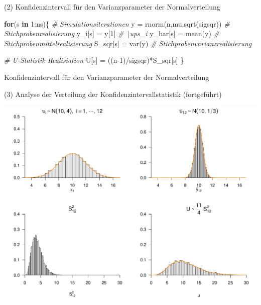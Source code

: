 \documentclass[
  8pt,
  ignorenonframetext,
]{beamer}
\newenvironment{Shaded}{\begin{snugshade}}{\end{snugshade}}
\newcommand{\CommentTok}[1]{\textcolor[rgb]{0.56,0.35,0.01}{\textit{#1}}}
\newcommand{\ControlFlowTok}[1]{\textcolor[rgb]{0.13,0.29,0.53}{\textbf{#1}}}
\newcommand{\DecValTok}[1]{\textcolor[rgb]{0.00,0.00,0.81}{#1}}
\newcommand{\FunctionTok}[1]{\textcolor[rgb]{0.00,0.00,0.00}{#1}}
\newcommand{\NormalTok}[1]{#1}
\newcommand{\OtherTok}[1]{\textcolor[rgb]{0.56,0.35,0.01}{#1}}
\newcommand{\SpecialCharTok}[1]{\textcolor[rgb]{0.00,0.00,0.00}{#1}}
\begin{document}
\begin{frame}[fragile]{(2) Konfidenzintervall für den Varianzparameter
der Normalverteilung}
\begin{Shaded}
\begin{Highlighting}[]
\ControlFlowTok{for}\NormalTok{(s }\ControlFlowTok{in} \DecValTok{1}\SpecialCharTok{:}\NormalTok{ns)\{                                 }\CommentTok{\# Simulationsiterationen}
\NormalTok{  y         }\OtherTok{=} \FunctionTok{rnorm}\NormalTok{(n,mu,}\FunctionTok{sqrt}\NormalTok{(sigsqr))          }\CommentTok{\# Stichprobenrealisierung}
\NormalTok{  y\_i[s]    }\OtherTok{=}\NormalTok{ y[}\DecValTok{1}\NormalTok{]                              }\CommentTok{\# \textbackslash{}ups\_i}
\NormalTok{  y\_bar[s]  }\OtherTok{=} \FunctionTok{mean}\NormalTok{(y)                           }\CommentTok{\# Stichprobenmittelrealisierung}
\NormalTok{  S\_sqr[s]  }\OtherTok{=} \FunctionTok{var}\NormalTok{(y)                            }\CommentTok{\# Stichprobenvarianzrealisierung}

  \CommentTok{\# U{-}Statistik Realisiation}
\NormalTok{  U[s]      }\OtherTok{=}\NormalTok{ ((n}\DecValTok{{-}1}\NormalTok{)}\SpecialCharTok{/}\NormalTok{sigsqr)}\SpecialCharTok{*}\NormalTok{S\_sqr[s]}
\NormalTok{\}}
\end{Highlighting}
\end{Shaded}
\end{frame}

\begin{frame}{\small Konfidenzintervall für den Varianzparameter der
Normalverteilung}
\protect\hypertarget{konfidenzintervall-fuxfcr-den-varianzparameter-der-normalverteilung-2}{}
\normalsize

\noindent (3) Analyse der Verteilung der Konfidenzintervallstatistik
(fortgeführt)

\vspace{1mm}

\begin{center}\includegraphics[width=0.8\linewidth]{11_Abbildungen/wtfi_11_u_statistik} \end{center}
\end{frame}
\end{document}
